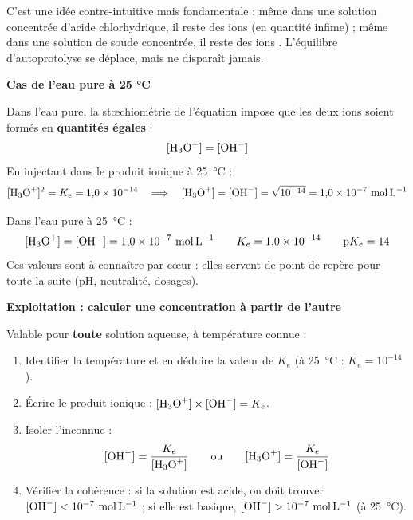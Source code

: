 \documentclass[11pt]{article}
\begin{document}
C'est une idée contre-intuitive mais fondamentale : même dans une solution concentrée d'acide chlorhydrique, il reste des ions  (en quantité infime) ; même dans une solution de soude concentrée, il reste des ions . L'équilibre d'autoprotolyse se déplace, mais ne disparaît jamais.

\textbf{Cas de l'eau pure à 25 °C}\par

Dans l'eau pure, la stœchiométrie de l'équation  impose que les deux ions soient formés en \textbf{quantités égales} :
\[ [\ce{H3O+}] = [\ce{OH-}] \]
En injectant dans le produit ionique à \SI{25}{\celsius} :
\[ [\ce{H3O+}]^2 = K_e = 1{,}0 \times 10^{-14} \quad \Longrightarrow \quad [\ce{H3O+}] = [\ce{OH-}] = \sqrt{10^{-14}} = 1{,}0 \times 10^{-7}~\si{mol.L^{-1}} \]

\begin{aretenir}
Dans l'eau pure à \SI{25}{\celsius} :
\[ [\ce{H3O+}] = [\ce{OH-}] = 1{,}0 \times 10^{-7}~\si{mol.L^{-1}} \qquad K_e = 1{,}0 \times 10^{-14} \qquad \mathrm{p}K_e = 14 \]
Ces valeurs sont à connaître par cœur : elles servent de point de repère pour toute la suite (pH, neutralité, dosages).
\end{aretenir}

\textbf{Exploitation : calculer une concentration à partir de l'autre}\par

\begin{methode}
Valable pour \textbf{toute} solution aqueuse, à température connue :
\begin{enumerate}
\item Identifier la température et en déduire la valeur de $K_e$ (à \SI{25}{\celsius} : $K_e = 10^{-14}$).
\item Écrire le produit ionique : $[\ce{H3O+}] \times [\ce{OH-}] = K_e$.
\item Isoler l'inconnue :
\[ [\ce{OH-}] = \frac{K_e}{[\ce{H3O+}]} \qquad \text{ou} \qquad [\ce{H3O+}] = \frac{K_e}{[\ce{OH-}]} \]
\item Vérifier la cohérence : si la solution est acide, on doit trouver $[\ce{OH-}] < 10^{-7}~\si{mol.L^{-1}}$ ; si elle est basique, $[\ce{OH-}] > 10^{-7}~\si{mol.L^{-1}}$ (à \SI{25}{\celsius}).
\end{enumerate}
\end{methode}
\end{document}
